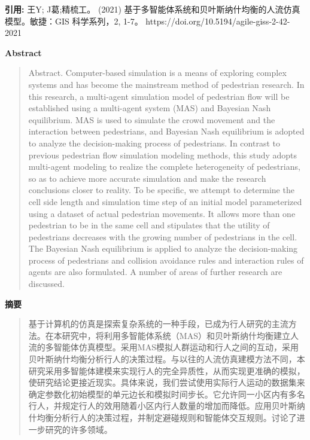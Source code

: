 \vspace{0.5em}
\noindent\textbf{引用:} 王Y; J葛;精梳工。 (2021) 基于多智能体系统和贝叶斯纳什均衡的人流仿真模型。敏捷：GIS 科学系列，2, 1-7。 https://doi.org/10.5194/agile-giss-2-42-2021

\vspace{1.5em}
\noindent\textbf{Abstract}\par
\begin{quote}\small
Abstract. Computer-based simulation is a means of exploring complex systems and has become the mainstream method of pedestrian research. In this research, a multi-agent simulation model of pedestrian flow will be established using a multi-agent system (MAS) and Bayesian Nash equilibrium. MAS is used to simulate the crowd movement and the interaction between pedestrians, and Bayesian Nash equilibrium is adopted to analyze the decision-making process of pedestrians. In contrast to previous pedestrian flow simulation modeling methods, this study adopts multi-agent modeling to realize the complete heterogeneity of pedestrians, so as to achieve more accurate simulation and make the research conclusions closer to reality. To be specific, we attempt to determine the cell side length and simulation time step of an initial model parameterized using a dataset of actual pedestrian movements. It allows more than one pedestrian to be in the same cell and stipulates that the utility of pedestrians decreases with the growing number of pedestrians in the cell. The Bayesian Nash equilibrium is applied to analyze the decision-making process of pedestrians and collision avoidance rules and interaction rules of agents are also formulated. A number of areas of further research are discussed.
\end{quote}

\noindent\textbf{摘要}\par
\begin{quote}\small
基于计算机的仿真是探索复杂系统的一种手段，已成为行人研究的主流方法。在本研究中，将利用多智能体系统（MAS）和贝叶斯纳什均衡建立人流的多智能体仿真模型。采用MAS模拟人群运动和行人之间的互动，采用贝叶斯纳什均衡分析行人的决策过程。与以往的人流仿真建模方法不同，本研究采用多智能体建模来实现行人的完全异质性，从而实现更准确的模拟，使研究结论更接近现实。具体来说，我们尝试使用实际行人运动的数据集来确定参数化初始模型的单元边长和模拟时间步长。它允许同一小区内有多名行人，并规定行人的效用随着小区内行人数量的增加而降低。应用贝叶斯纳什均衡分析行人的决策过程，并制定避碰规则和智能体交互规则。讨论了进一步研究的许多领域。
\end{quote}


